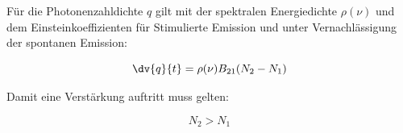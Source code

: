 \documentclass[slug=GL, room=HZDR\ Dresden/Rossendorf\,\ Geb.\ 620/123, supervisor=Martin\ Rehwald;\, Tim\ Ziegler]{../../Lab_Report_LaTeX/lab_report}
\begin{document}
F\"ur die Photonenzahldichte \(q\) gilt mit der spektralen
Energiedichte \(\rho(\nu)\) und dem Einsteinkoeffizienten f\"ur
Stimulierte Emission und unter Vernachl\"assigung der spontanen
Emission:

\begin{equation}
  \label{eq:qrate}
  \dv{q}{t}=\rho(\nu)B_{21}(N_2-N_1)
\end{equation}

Damit eine Verst\"arkung auftritt muss gelten:

\begin{equation}
  \label{eq:first}
  \tag{Erste Laserbedingung}
  N_2>N_1
\end{equation}
\end{document}
